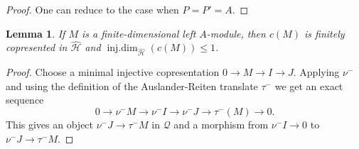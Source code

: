 \documentclass[11pt,a4paper]{amsart}
\theoremstyle{plain}
\newtheorem{lem}[thm]{Lemma}
\theoremstyle{definition}
\begin{document}
\begin{proof}
One can reduce to the case when $P=P'=A$.
\end{proof}

\begin{lem}
\label{l:cid}
If $M$ is a finite-dimensional left $A$-module, then ${c} (M)$ is finitely copresented in ${\widehat{\mathcal{H}}  }$ and
$\operatorname{inj.dim}_{\widehat{\mathcal{H}}  } ({c} (M)) \leq 1$. 
\end{lem}

\begin{proof}
Choose a minimal injective copresentation 
$0\to M\to I \to J$.
Applying $\nu^-$ and using the definition of the Auslander-Reiten translate $\tau^-$ 
we get an exact sequence
\[
0\to \nu^- M \to \nu^- I \to \nu^- J \to \tau^-(M)\to 0.
\]
This gives an object $\nu^- J\to \tau^- M$ in ${\mathcal{Q}}$
and a morphism from $\nu^- I\to 0$ to $\nu^- J\to \tau^- M$.


\end{proof}
\end{document}
